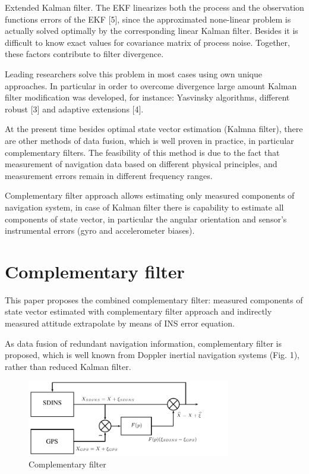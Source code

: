 \documentclass[conference, utf8]{IEEEtran}
\begin{document}
Extended Kalman filter. The EKF linearizes both the process  and the observation functions 
errors of the EKF [5], since the approximated none-linear problem is actually solved 
optimally by the corresponding linear Kalman filter. Besides it is difficult to know exact 
values for covariance matrix of process noise. Together, these factors contribute to filter 
divergence. 

Leading researchers solve this problem in most cases using own unique approaches. In 
particular in order to overcome divergence large amount Kalman filter modification 
was developed, for instance: Yasvinsky algorithms, different robust [3] and adaptive 
extensions [4].  

At the present time besides optimal state vector estimation (Kalmna filter), there are 
other methods of data fusion, which is well proven in practice, in particular 
complementary filters. The feasibility of this method is due to the fact that 
measurement of navigation data based on different physical principles, and 
measurement errors remain in different frequency ranges.

Complementary filter approach allows estimating only measured components of 
navigation system, in case of Kalman filter there is capability to estimate all 
components of state vector, in particular the angular orientation and sensor’s 
instrumental errors (gyro and accelerometer biases).

\section{Complementary filter}
This paper proposes the combined complementary filter: measured components of state 
vector estimated with complementary filter approach and indirectly measured attitude 
extrapolate by means of INS error equation.

As data fusion of redundant navigation information, complementary filter is proposed, 
which is well known from Doppler inertial navigation systems (Fig. 1), rather than 
reduced Kalman filter.

\begin{figure}[!t]
\centering
\includegraphics[width=3.5in]{f1.pdf}
\caption{Complementary filter}
\label{fig:compl}
\end{figure}
\end{document}
